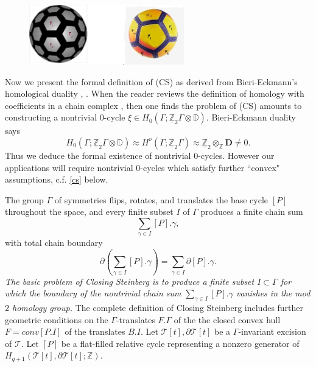 \documentclass[12pt]{amsart}
\theoremstyle{definition}
\theoremstyle{remark}
\newcommand{\bZ}{\mathbb{Z}}
\newcommand{\del}{\partial}
\newcommand{\bD}{\mathbb{D}}
\newcommand{\sT}{\mathscr{T}}
\begin{document}


\begin{figure}\label{nikeball}
\centering
\includegraphics[width=0.6\textwidth]{ball-nike-pitch.jpg}
\caption{}
\end{figure}

Now we present the formal definition of (CS) as derived from Bieri-Eckmann's homological duality \cite{BiEck}, \cite{BS}. When the reader reviews the definition of homology with coefficients in a chain complex \cite{Brown}, then one finds the problem of (CS) amounts to constructing a nontrivial $0$-cycle $\xi \in H_0(\Gamma; \underline{\bZ}_2 \Gamma \otimes \bD)$. Bieri-Eckmann duality says $$H_0(\Gamma; \underline{\bZ}_2 \Gamma \otimes \bD) \approx H^\nu(\Gamma; \underline{\bZ}_2 \Gamma)\approx \underline{\bZ}_2 \otimes_\bZ \textbf{D}\neq 0.$$ Thus we deduce the formal existence of nontrivial $0$-cycles. However our applications will require nontrivial $0$-cycles which satisfy further ``convex" assumptions, c.f. \eqref{cs} below.

The group $\Gamma$ of symmetries flips, rotates, and translates the base cycle $[P]$ throughout the space, and every finite subset $I$ of $\Gamma$ produces a finite chain sum $$\sum_{\gamma\in I} [P].\gamma,$$ with total chain boundary $$\del(\sum_{\gamma\in I} [P].\gamma)=\sum_{\gamma\in I} \del [P].\gamma.$$ \textit{The basic problem of Closing Steinberg is to produce a finite subset $I \subset \Gamma$ for which the boundary of the nontrivial chain sum $\sum_{\gamma\in I} [P].\gamma$ vanishes in the mod $2$ homology group.} The complete definition of Closing Steinberg includes further geometric conditions on the $\Gamma$-translates $F.\Gamma$ of the the closed convex hull $F=conv[P.I]$ of the translates $B.I$. Let $\sT[t], \del \sT[t]$ be a $\Gamma$-invariant excision of $\sT$. Let $[P]$ be a flat-filled relative cycle representing a nonzero generator of $H_{q+1}(\sT[t], \del \sT[t]; \bZ)$.
\end{document}

